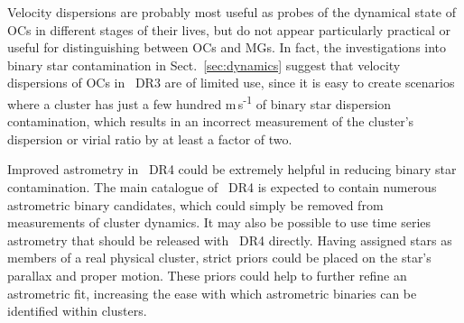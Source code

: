 Velocity dispersions are probably most useful as probes of the dynamical state of OCs in different stages of their lives, but do not appear particularly practical or useful for distinguishing between OCs and MGs. In fact, the investigations into binary star contamination in Sect.~\ref{sec:dynamics} suggest that velocity dispersions of OCs in \gaia\ DR3 are of limited use, since it is easy to create scenarios where a cluster has just a few hundred m\,s\textsuperscript{-1} of binary star dispersion contamination, which results in an incorrect measurement of the cluster's dispersion or virial ratio by at least a factor of two.

Improved astrometry in \gaia\ DR4 could be extremely helpful in reducing binary star contamination. The main catalogue of \gaia\ DR4 is expected to contain numerous astrometric binary candidates, which could simply be removed from measurements of cluster dynamics. It may also be possible to use time series astrometry that should be released with \gaia\ DR4 directly. Having assigned stars as members of a real physical cluster, strict priors could be placed on the star's parallax and proper motion. These priors could help to further refine an astrometric fit, increasing the ease with which astrometric binaries can be identified within clusters. 



